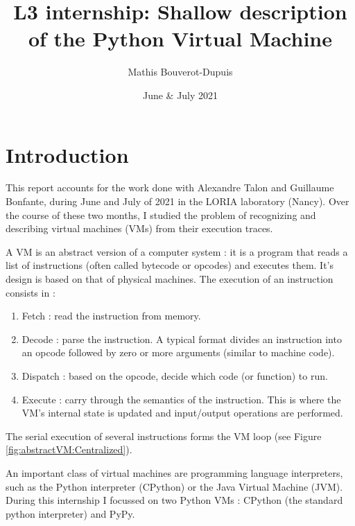 \documentclass[french]{article}
\begin{document}
	
\title{L3 internship: Shallow description of the Python Virtual Machine}
\author{Mathis Bouverot-Dupuis}
\date{June \& July 2021}

\maketitle 

\tableofcontents
\newpage

\section{Introduction}
This report accounts for the work done with Alexandre Talon and Guillaume Bonfante, during June and July of 2021 in the LORIA laboratory (Nancy). Over the course of these two months, I studied the problem of recognizing and describing virtual machines (VMs) from their execution traces.

A VM is an abstract version of a computer system : it is a program that reads a list of instructions (often called bytecode or opcodes) and executes them. It's design is based on that of physical machines. The execution of an instruction consists in :
\begin{enumerate}
	\item Fetch : read the instruction from memory.
	\item Decode : parse the instruction. A typical format divides an instruction into an opcode followed by zero or more arguments (similar to machine code).
	\item Dispatch : based on the opcode, decide which code (or function) to run.
	\item Execute : carry through the semantics of the instruction. This is where the VM's internal state is updated and input/output operations are performed.
\end{enumerate}
The serial execution of several instructions forms the VM loop (see Figure \ref{fig:abstractVM:Centralized}).


An important class of virtual machines are programming language interpreters, such as the Python interpreter (CPython) or the Java Virtual Machine (JVM). During this internship I focussed on two Python VMs : CPython (the standard python interpreter) and PyPy. 


\end{document}
